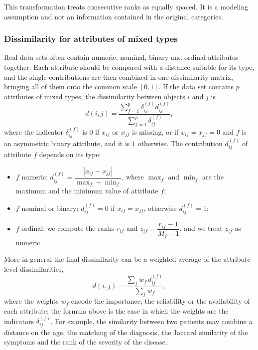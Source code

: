 \begin{remark}
This transformation treats consecutive ranks as equally spaced. It is a modeling assumption and not an information contained in the original categories.
\end{remark}

\subsubsection{Dissimilarity for attributes of mixed types}
Real data sets often contain numeric, nominal, binary and ordinal attributes together. Each attribute should be compared with a distance suitable for its type, and the single contributions are then combined in one dissimilarity matrix, bringing all of them onto the common scale $[0,1]$. If the data set contains $p$ attributes of mixed types, the dissimilarity between objects $i$ and $j$ is
\[
    d(i,j)=\frac{\sum_{f=1}^{p}\delta_{ij}^{(f)}d_{ij}^{(f)}}{\sum_{f=1}^{p}\delta_{ij}^{(f)}},
\]
where the indicator $\delta_{ij}^{(f)}$ is $0$ if $x_{if}$ or $x_{jf}$ is missing, or if $x_{if}=x_{jf}=0$ and $f$ is an asymmetric binary attribute, and it is $1$ otherwise. The contribution $d_{ij}^{(f)}$ of attribute $f$ depends on its type:
\begin{itemize}
    \item $f$ numeric: $d_{ij}^{(f)}=\dfrac{|x_{if}-x_{jf}|}{\max_f-\min_f}$, where $\max_f$ and $\min_f$ are the maximum and the minimum value of attribute $f$;
    \item $f$ nominal or binary: $d_{ij}^{(f)}=0$ if $x_{if}=x_{jf}$, otherwise $d_{ij}^{(f)}=1$;
    \item $f$ ordinal: we compute the ranks $r_{if}$ and $z_{if}=\dfrac{r_{if}-1}{M_f-1}$, and we treat $z_{if}$ as numeric.
\end{itemize}
More in general the final dissimilarity can be a weighted average of the attribute-level dissimilarities,
\[
    d(i,j)=\frac{\sum_{f}w_f\,d_{ij}^{(f)}}{\sum_{f}w_f},
\]
where the weights $w_f$ encode the importance, the reliability or the availability of each attribute; the formula above is the case in which the weights are the indicators $\delta_{ij}^{(f)}$. For example, the similarity between two patients may combine a distance on the age, the matching of the diagnosis, the Jaccard similarity of the symptoms and the rank of the severity of the disease.

